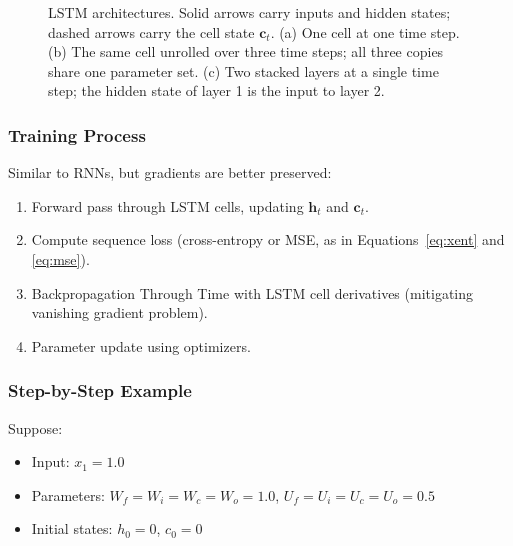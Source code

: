 \documentclass[11pt]{article}
\theoremstyle{remark}
\begin{document}
\begin{figure}[htbp]
\vspace{0.8cm}

\caption{LSTM architectures. Solid arrows carry inputs and hidden states; dashed arrows carry the cell state $\mathbf{c}_t$. (a) One cell at one time step. (b) The same cell unrolled over three time steps; all three copies share one parameter set. (c) Two stacked layers at a single time step; the hidden state of layer 1 is the input to layer 2.}
\label{fig:lstm}
\end{figure}

\subsubsection*{Training Process}
Similar to RNNs, but gradients are better preserved:
\begin{enumerate}[label=\roman*)]
    \item Forward pass through LSTM cells, updating $\mathbf{h}_t$ and $\mathbf{c}_t$.
    \item Compute sequence loss (cross-entropy or MSE, as in Equations~\eqref{eq:xent} and \eqref{eq:mse}).
    \item Backpropagation Through Time with LSTM cell derivatives (mitigating vanishing gradient problem).
    \item Parameter update using optimizers.
\end{enumerate}

\subsubsection*{Step-by-Step Example}
Suppose:
\begin{itemize}
    \item Input: $x_1 = 1.0$
    \item Parameters: $W_f=W_i=W_c=W_o=1.0$, $U_f=U_i=U_c=U_o=0.5$
    \item Initial states: $h_0=0$, $c_0=0$
\end{itemize}
\end{document}
